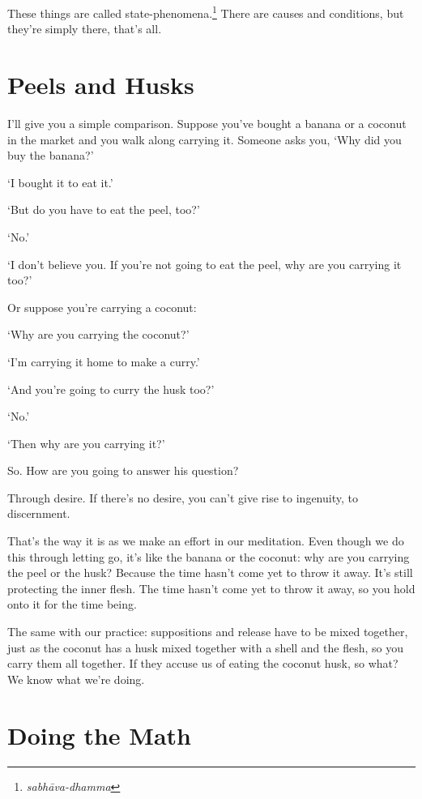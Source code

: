 These things are called state-phenomena.\footnote{\textit{sabh\=ava-dhamma}} There are causes and conditions, but they're simply there, that's all.

\clearpage

\section{Peels and Husks}

\enlargethispage{2\baselineskip}
I'll give you a simple comparison. Suppose you've bought a banana or a coconut in the market and you walk along carrying it. Someone asks you, `Why did you buy the banana?'

`I bought it to eat it.'

`But do you have to eat the peel, too?'

`No.'

`I don't believe you. If you're not going to eat the peel, why are you carrying it too?'

Or suppose you're carrying a coconut:

`Why are you carrying the coconut?'

`I'm carrying it home to make a curry.'

`And you're going to curry the husk too?'

`No.'

`Then why are you carrying it?'

So. How are you going to answer his question?

Through desire. If there's no desire, you can't give rise to ingenuity, to discernment. 

That's the way it is as we make an effort in our meditation. Even though we do this through letting go, it's like the banana or the coconut: why are you carrying the peel or the husk? Because the time hasn't come yet to throw it away. It's still protecting the inner flesh. The time hasn't come yet to throw it away, so you hold onto it for the time being. 

The same with our practice: suppositions and release have to be mixed together, just as the coconut has a husk mixed together with a shell and the flesh, so you carry them all together. If they accuse us of eating the coconut husk, so what? We know what we're doing.

\clearpage

\section{Doing the Math} 

